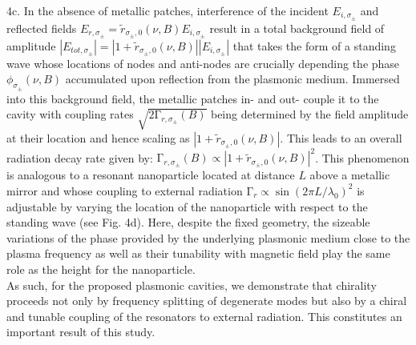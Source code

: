 \documentclass[twocolumn]{article}
\begin{document}
4c. In the absence of metallic patches, interference of the incident $E_{i,\sigma_{\pm}}$ and reflected fields $E_{r,\sigma_{\pm}}=\tilde{r}_{\sigma_{\pm},0}(\nu,B)E_{i,\sigma_{\pm}}$ result in a total background field of amplitude $\left| E_{tot,\sigma_{\pm}}\right|=\left| 1+\tilde{r}_{\sigma_{\pm},0}(\nu,B)\right| \left| E_{i,\sigma_{\pm}}\right| $ that takes the form of a standing wave whose locations of nodes and anti-nodes are crucially depending the phase $\phi_{\sigma_{\pm}}(\nu,B)$ accumulated upon reflection from the plasmonic medium. Immersed into this background field, the metallic patches in- and out- couple it to the cavity with coupling rates $\sqrt{2\mathrm{\Gamma }_{r,\sigma_{\pm}}(B)}$ \cite{Fan_2003} being determined by the field amplitude at their location and hence scaling as $ \left| 1+\tilde{r}_{\sigma_{\pm},0}(\nu,B) \right|$. This leads to an overall radiation decay rate given by: ${\mathrm{\Gamma }}_{r,\sigma_{\pm}}(B) \propto \left| 1+\tilde{r}_{\sigma_{\pm},0}(\nu,B) \right| ^2 $. This phenomenon is analogous to a resonant nanoparticle located at distance $L$ above a metallic mirror and whose coupling to external radiation ${\mathrm{\Gamma }}_r\propto\sin(2\pi L/\lambda_0)^2$ is adjustable by varying the location of the nanoparticle with respect to the standing wave (see Fig. 4d). Here, despite the fixed geometry, the sizeable variations of the phase provided by the underlying plasmonic medium close to the plasma frequency as well as their tunability with magnetic field play the same role as the height for the nanoparticle. \\
\noindent As such, for the proposed plasmonic cavities, we demonstrate that chirality proceeds not only by frequency splitting of degenerate modes but also by a chiral and tunable coupling of the resonators to external radiation. This constitutes an important result of this study.
\noindent 
\end{document}
